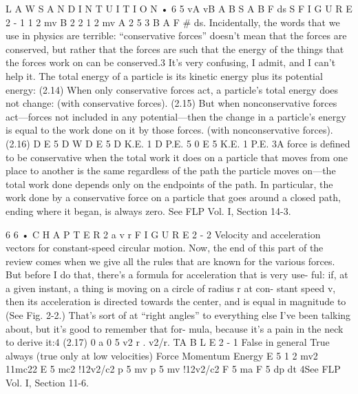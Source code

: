 \documentclass[10pt,oneside]{article}
\begin{document}
L A W S  A N D  I N T U I T I O N • 6 5 vA vB A B S A B F ds S F I G U R E  2 - 1 1 2  mv B 2 2 1 2  mv A 2 5 3 B A F \# ds. Incidentally, the words that we use in physics are terrible: “conservative forces” doesn’t mean that the forces are conserved, but rather that the forces are such that the energy of the things that the forces work on can be conserved.3 It’s very confusing, I admit, and I can’t help it. The total energy of a particle is its kinetic energy plus its potential energy: (2.14) When only conservative forces act, a particle’s total energy does not change: (with conservative forces). (2.15) But when nonconservative forces act---forces not included in any potential---then the change in a particle’s energy is equal to the work done on it by those forces. (with nonconservative forces). (2.16) D E 5 D W D E 5 D K.E. 1 D P.E. 5 0 E 5 K.E. 1 P.E. 3A force is defined to be conservative when the total work it does on a particle that moves from one place to another is the same regardless of the path the particle moves on---the total work done depends only on the endpoints of the path. In particular, the work done by a conservative force on a particle that goes around a closed path, ending where it began, is always zero. See FLP Vol. I, Section 14-3.\par

6 6 • C H A P T E R  2 a v r F I G U R E 2 - 2 Velocity and acceleration vectors for constant-speed circular motion. Now, the end of this part of the review comes when we give all the rules that are known for the various forces. But before I do that, there’s a formula for acceleration that is very use- ful: if, at a given instant, a thing is moving on a circle of radius r at con- stant speed v, then its acceleration is directed towards the center, and is equal in magnitude to (See Fig. 2-2.) That’s sort of at “right angles” to everything else I’ve been talking about, but it’s good to remember that for- mula, because it’s a pain in the neck to derive it:4 (2.17) 0 a 0 5 v2 r . v2/r. TA B L E 2 - 1 False in general True always (true only at low velocities) Force Momentum Energy E 5  1 2 mv2 11mc22 E 5 mc2 !12v2/c2 p 5 mv p 5 mv !12v2/c2 F 5 ma F 5 dp dt 4See FLP Vol. I, Section 11-6.\par
\end{document}
